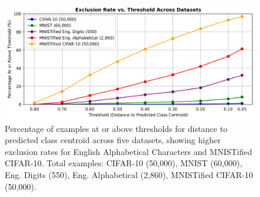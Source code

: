 \begin{figure}[ht!]
    \centering
    \includegraphics[width=0.99\columnwidth]{Figures/Results/Exclusion_Rate_vs_Threshold.png}
    \caption{Percentage of examples at or above thresholds for distance to predicted class centroid across five datasets, showing higher exclusion rates for English Alphabetical Characters and MNISTified CIFAR-10. Total examples: CIFAR-10 (50,000), MNIST (60,000), Eng. Digits (550), Eng. Alphabetical (2,860), MNISTified CIFAR-10 (50,000).}
\label{fig:Exclusion_Rate_vs_Threshold}
\end{figure}


